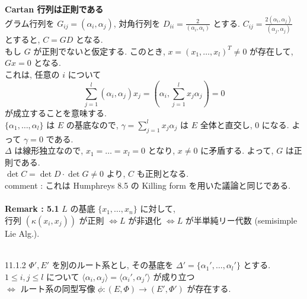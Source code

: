 \documentclass[uplatex,dvipdfmx]{jsarticle}
\begin{document}
\noindent\textbf{ Cartan 行列は正則である}\\
グラム行列を $G_{ij} = (\alpha_i, \alpha_j)$, 対角行列を $D_{ii} = \frac{2}{(\alpha_i, \alpha_i)}$ とする.
$C_{ij} = \frac{2 (\alpha_i, \alpha_j)}{(\alpha_j, \alpha_j)}$ とすると, $C = G D$ となる.\\
もし $G$ が正則でないと仮定する. このとき, $x = (x_1, \dots, x_l)^T \neq 0$ が存在して, $Gx = 0$ となる.\\
これは, 任意の $i$ について 
\begin{equation*}
    \sum_{j=1}^l (\alpha_i, \alpha_j) x_j = \left( \alpha_i, \sum_{j=1}^l x_j \alpha_j \right) = 0
\end{equation*} 
が成立することを意味する.\\
$\{\alpha_1, \dots, \alpha_l\}$ は $E$ の基底なので, $\gamma = \sum_{j=1}^l x_j \alpha_j$ は $E$ 全体と直交し, $0$ になる. よって $\gamma = 0$ である.\\
$\Delta$ は線形独立なので, $x_1 = \dots = x_l = 0$ となり, $x \neq 0$ に矛盾する. よって, $G$ は正則である.~\\
$\det C = \det D \cdot \det G \neq 0$ より, $C$ も正則となる.\\
comment : これは Humphreys 8.5 の Killing form を用いた議論と同じである.\\\\
\textbf{Remark : 5.1}
    $L$ の基底 $\{x_1, \dots, x_n\}$ に対して,\\
    行列 $(\kappa(x_i, x_j))$ が正則 $\iff L$ が非退化 $\iff L$ が半単純リー代数 (semisimple Lie Alg.).\\\\
\begin{myprop}{11.1.2}
    $\Phi', E'$ を別のルート系とし, その基底を $\Delta' = \{\alpha_1', \dots, \alpha_l'\}$ とする.\\
    $1 \le i, j \le l$ について $\langle \alpha_i, \alpha_j \rangle = \langle \alpha_i', \alpha_j' \rangle$ が成り立つ\\
    $\iff$ ルート系の同型写像 $\phi: (E, \Phi) \to (E', \Phi')$ が存在する.
\end{myprop}
\end{document}
